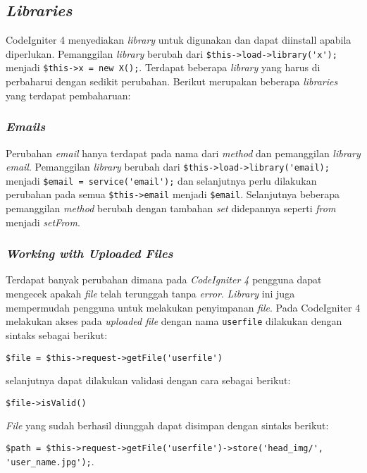 \subsection{\textit{Libraries}}
 
CodeIgniter 4 menyediakan \textit{library} untuk digunakan dan dapat diinstall apabila diperlukan. Pemanggilan \textit{library} berubah dari \verb|$this->load->library('x');| menjadi \verb|$this->x = new X();|. Terdapat beberapa \textit{library} yang harus di perbaharui dengan sedikit perubahan. Berikut merupakan beberapa \textit{libraries} yang terdapat pembaharuan:

\subsubsection{\textit{Emails}}

Perubahan \textit{email} hanya terdapat pada nama dari \textit{method} dan pemanggilan \textit{library email}. Pemanggilan  \textit{library} berubah dari \verb|$this->load->library('email);| menjadi \verb|$email = service('email');| dan selanjutnya perlu dilakukan perubahan pada semua \verb|$this->email| menjadi \verb|$email|. Selanjutnya beberapa pemanggilan \textit{method} berubah dengan tambahan \textit{set} didepannya seperti \textit{from} menjadi \textit{setFrom}.

\subsubsection{\textit{Working with Uploaded Files}}

Terdapat banyak perubahan dimana pada \textit{CodeIgniter 4} pengguna dapat mengecek apakah \textit{file} telah terunggah tanpa \textit{error}. \textit{Library} ini juga mempermudah pengguna untuk melakukan penyimpanan \textit{file}. Pada CodeIgniter 4 melakukan akses pada \textit{uploaded file} dengan nama \texttt{userfile} dilakukan dengan sintaks sebagai berikut:
\begin{center}
\verb|$file = $this->request->getFile('userfile')|
\end{center} selanjutnya dapat dilakukan validasi dengan cara sebagai berikut:
\begin{center}
\verb|$file->isValid()|
\end{center} 
\textit{File} yang sudah berhasil diunggah dapat disimpan dengan sintaks berikut:
\begin{center}
\verb|$path = $this->request->getFile('userfile')->store('head_img/', 'user_name.jpg');|.
\end{center} 

